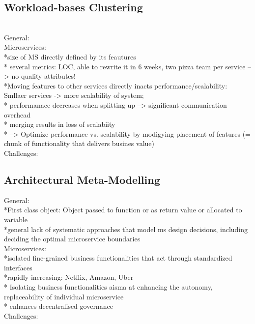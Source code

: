 \subsection{Workload-bases Clustering}
\cite{WorkloadbasedClustering} \\

General: \\

Microservices: \\
*size of MS directly defined by its feautures\\
* several metrics: LOC, able to rewrite it in 6 weeks,  two pizza team per service --> no quality attributes!\\
*Moving features to other services directly inacts performance/scalability:  Smllaer services -> more scalability of system; \\
* performanace decreases when splitting up --> significant communication overhead \\
* merging results in loss of scalabiity\\
* --> Optimize performance vs. scalability by modigying placement of features (= chunk of functionality that delivers busines value)\\


Challenges:\\


\subsection{Architectural Meta-Modelling}
\cite{ArchitecturalMetaModelling}


General:\\
*First class object: Object passed to function or as return value  or  allocated to variable\\
*general lack of systematic approaches that model ms design decisions, including deciding the optimal microservice boundaries\\

Microservices:\\
*isolated fine-grained business functionalities that act through standardized interfaces\\
*rapidly increasing: Netflix, Amazon, Uber\\
* Isolating business functionalities aisma at enhancing the autonomy, replaceability of individual microservice\\
* enhances decentralised governance\\



Challenges:\\



